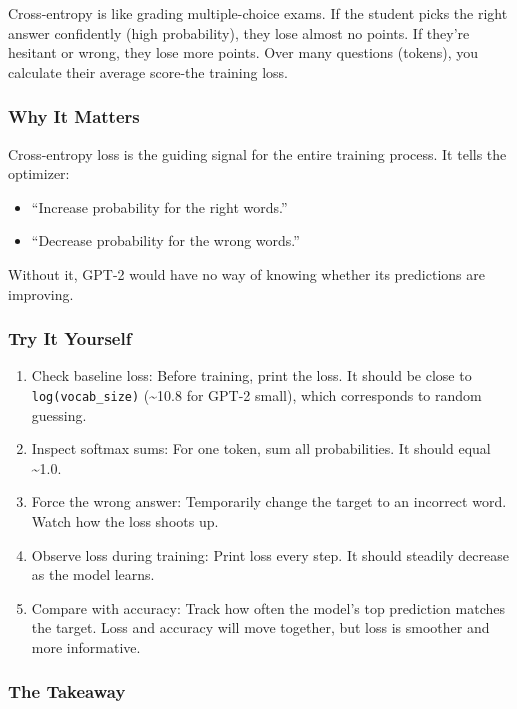 \documentclass[
  letterpaper,
  DIV=11,
  numbers=noendperiod]{scrreprt}
\providecommand{\tightlist}{%
  \setlength{\itemsep}{0pt}\setlength{\parskip}{0pt}}
\begin{document}
Cross-entropy is like grading multiple-choice exams. If the student
picks the right answer confidently (high probability), they lose almost
no points. If they're hesitant or wrong, they lose more points. Over
many questions (tokens), you calculate their average score-the training
loss.

\subsubsection{Why It Matters}\label{why-it-matters-24}

Cross-entropy loss is the guiding signal for the entire training
process. It tells the optimizer:

\begin{itemize}
\tightlist
\item
  ``Increase probability for the right words.''
\item
  ``Decrease probability for the wrong words.''
\end{itemize}

Without it, GPT-2 would have no way of knowing whether its predictions
are improving.

\subsubsection{Try It Yourself}\label{try-it-yourself-26}

\begin{enumerate}
\def\labelenumi{\arabic{enumi}.}
\tightlist
\item
  Check baseline loss: Before training, print the loss. It should be
  close to \texttt{log(vocab\_size)} (\textasciitilde10.8 for GPT-2
  small), which corresponds to random guessing.
\item
  Inspect softmax sums: For one token, sum all probabilities. It should
  equal \textasciitilde1.0.
\item
  Force the wrong answer: Temporarily change the target to an incorrect
  word. Watch how the loss shoots up.
\item
  Observe loss during training: Print loss every step. It should
  steadily decrease as the model learns.
\item
  Compare with accuracy: Track how often the model's top prediction
  matches the target. Loss and accuracy will move together, but loss is
  smoother and more informative.
\end{enumerate}

\subsubsection{The Takeaway}\label{the-takeaway-26}
\end{document}
